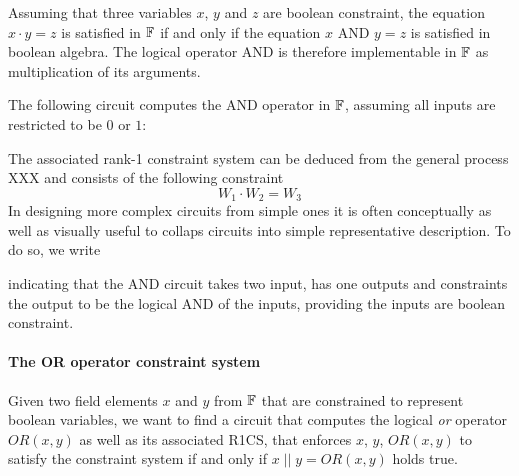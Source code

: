 Assuming that three variables $x$, $y$ and $z$ are boolean constraint, the equation $x\cdot y = z$ is satisfied in $\mathbb{F}$ if and only if the equation $x\text{ AND }y = z$ is satisfied in boolean algebra. The logical operator AND is therefore implementable in $\mathbb{F}$ as multiplication of its arguments. 

The following circuit computes the AND operator in $\mathbb{F}$, assuming all inputs are restricted to be $0$ or $1$:
\begin{center}
\end{center}
The associated rank-1 constraint system can be deduced from the general process XXX and consists of the following constraint
\begin{equation}
 W_1 \cdot W_2 = W_3
\end{equation}
In designing more complex circuits from simple ones it is often conceptually as well as visually useful to collaps circuits into simple representative description. To do so, we write 
\begin{center}
\end{center}
indicating that the AND circuit takes two input, has one outputs and constraints the output to be the logical AND of the inputs, providing the inputs are boolean constraint.
\paragraph{The OR operator constraint system} Given two field elements $x$ and $y$ from $\mathbb{F}$ that are constrained to represent boolean variables, we want to find a circuit that computes the logical \textit{or} operator $OR(x,y)$ as well as its associated R1CS, that enforces $x$, $y$, $OR(x,y)$ to satisfy the constraint system if and only if $x\; || \; y =OR(x,y)$ holds true. 

